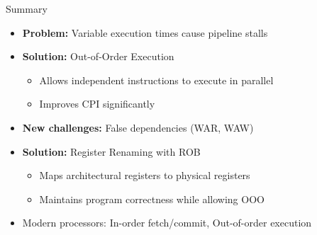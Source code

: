 \documentclass[aspectratio=169,12pt]{beamer}
\begin{document}
\begin{frame}{Summary}
    \begin{itemize}
        \item \textbf{Problem:} Variable execution times cause pipeline stalls
        \item \textbf{Solution:} Out-of-Order Execution
        \begin{itemize}
            \item Allows independent instructions to execute in parallel
            \item Improves CPI significantly
        \end{itemize}
        \item \textbf{New challenges:} False dependencies (WAR, WAW)
        \item \textbf{Solution:} Register Renaming with ROB
        \begin{itemize}
            \item Maps architectural registers to physical registers
            \item Maintains program correctness while allowing OOO
        \end{itemize}
        \item Modern processors: In-order fetch/commit, Out-of-order execution
    \end{itemize}
\end{frame}
\end{document}
